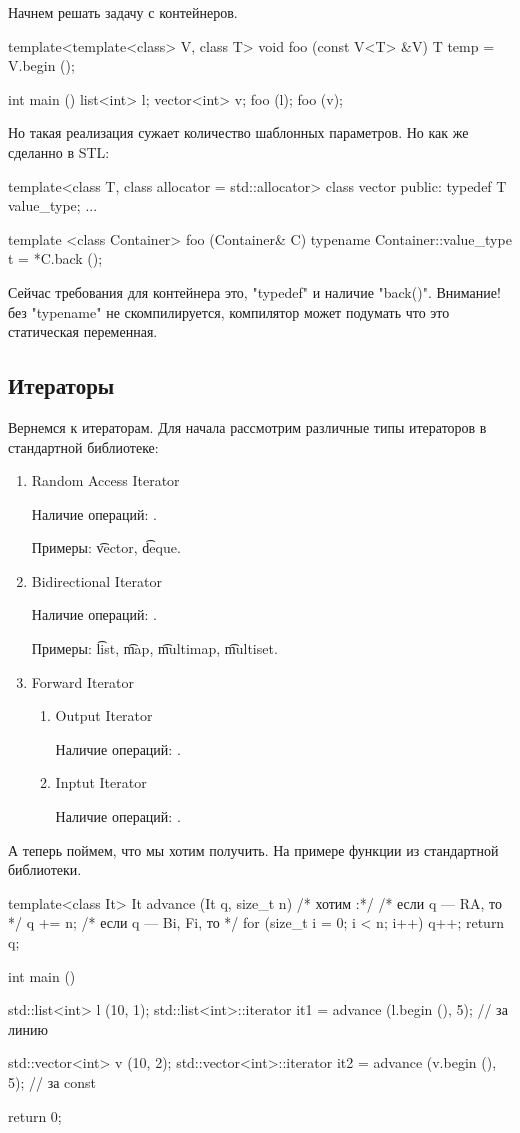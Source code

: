 Начнем решать задачу с контейнеров. 
\begin{cppcode}
template<template<class> V, class T>
void foo (const V<T> &V) {
	T temp = V.begin ();
}

int main () {
	list<int> l; 
	vector<int> v;
	foo (l);
	foo (v); 
}
\end{cppcode}

Но такая реализация сужает количество шаблонных параметров. 
Но как же сделанно в STL: 
\begin{cppcode}
template<class T, class allocator = std::allocator>
class vector {
public:
	typedef T value_type; 
...
}


template <class Container>
foo (Container& C) {
	typename Container::value_type
		t = *C.back ();
}
\end{cppcode}

Сейчас требования для контейнера это, \cpp"typedef" и наличие \cpp"back()". 
Внимание! без \cpp"typename" не скомпилируется, компилятор может подумать что это статическая переменная.


\subsection{Итераторы}
Вернемся к итераторам.
Для начала рассмотрим различные типы итераторов в стандартной библиотеке:
\begin{enumerate}
\item 
	Random Access Iterator 

	Наличие операций: \cpp{*->, ++, --, -, +=, -=}.

	Примеры: \t{vector}, \t{deque}.
\item
	Bidirectional Iterator

	Наличие операций: \cpp{*->, ++, --}.

	Примеры: \t{list}, \t{map}, \t{multimap}, \t{multiset}.
\item
	Forward Iterator 
	\begin{enumerate}
	\item
		Output Iterator

		Наличие операций: .
	\item
		Inptut Iterator

		Наличие операций: .
	\end{enumerate}
\end{enumerate}

А теперь поймем, что мы хотим получить.
На примере функции  из стандартной библиотеки.
\begin{cppcode}
template<class It>
It advance (It q, size_t n) {
	/* хотим :*/
	/* если q --- RA, то */
		q += n;
	/* если q --- Bi, Fi, то */
		for (size_t i = 0; i < n; i++)
			q++;
	return q;
}

int main () {
	std::list<int> l (10, 1); 
	std::list<int>::iterator 	it1 = advance (l.begin (), 5); // за линию 

	std::vector<int> v (10, 2);
	std::vector<int>::iterator 	it2 = advance (v.begin (), 5); // за const

	return 0;
}
\end{cppcode}

